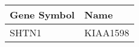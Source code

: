 \begin{tabular}{ll}
\toprule
Gene Symbol &     Name \\
\midrule
      SHTN1 & KIAA1598 \\
\bottomrule
\end{tabular}
